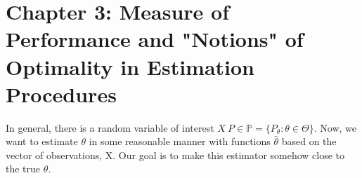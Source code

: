 \section{Chapter 3: Measure of Performance and "Notions" of Optimality in Estimation Procedures}
	
	In general, there is a random variable of interest $X ~ P \in \mathbb{P} = \{P_\theta : \theta \in \Theta \}$. Now, we want to estimate $\theta$ in some reasonable manner with functions $\hat{\theta}$ based on the vector of observations, X. Our goal is to make this estimator somehow close to the true $\theta$. 

